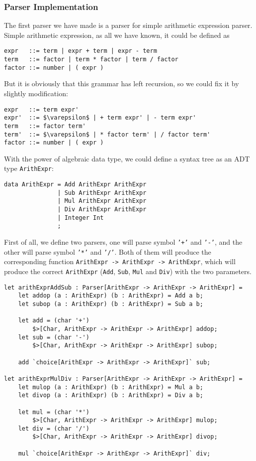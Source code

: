\subsubsection{Parser Implementation}

The first parser we have made is a parser for simple arithmetic expression parser. Simple arithmetic expression, as all we have known, it could be defined as

\begin{lstlisting}[language={}]
expr   ::= term | expr + term | expr - term
term   ::= factor | term * factor | term / factor
factor ::= number | ( expr )
\end{lstlisting}

But it is obviously that this grammar has left recursion, so we could fix it by slightly modification:

\begin{lstlisting}[language={},mathescape]
expr   ::= term expr'
expr'  ::= $\varepsilon$ | + term expr' | - term expr'
term   ::= factor term'
term'  ::= $\varepsilon$ | * factor term' | / factor term'
factor ::= number | ( expr )
\end{lstlisting}

With the power of algebraic data type, we could define a syntax tree as an ADT type \texttt{ArithExpr}:

\begin{lstlisting}
data ArithExpr = Add ArithExpr ArithExpr
               | Sub ArithExpr ArithExpr
               | Mul ArithExpr ArithExpr
               | Div ArithExpr ArithExpr
               | Integer Int
               ;
\end{lstlisting}

First of all, we define two parsers, one will parse symbol \texttt{'+'} and \texttt{'-'}, and the other will parse symbol \texttt{'*'} and \texttt{'/'}. Both of them will produce the corresponding function \texttt{ArithExpr -> ArithExpr -> ArithExpr}, which will produce the correct \texttt{ArithExpr} (\texttt{Add}, \texttt{Sub}, \texttt{Mul} and \texttt{Div}) with the two parameters.

\begin{lstlisting}
let arithExprAddSub : Parser[ArithExpr -> ArithExpr -> ArithExpr] =
    let addop (a : ArithExpr) (b : ArithExpr) = Add a b;
    let subop (a : ArithExpr) (b : ArithExpr) = Sub a b;

    let add = (char '+')
        $>[Char, ArithExpr -> ArithExpr -> ArithExpr] addop;
    let sub = (char '-')
        $>[Char, ArithExpr -> ArithExpr -> ArithExpr] subop;

    add `choice[ArithExpr -> ArithExpr -> ArithExpr]` sub;

let arithExprMulDiv : Parser[ArithExpr -> ArithExpr -> ArithExpr] =
    let mulop (a : ArithExpr) (b : ArithExpr) = Mul a b;
    let divop (a : ArithExpr) (b : ArithExpr) = Div a b;

    let mul = (char '*')
        $>[Char, ArithExpr -> ArithExpr -> ArithExpr] mulop;
    let div = (char '/')
        $>[Char, ArithExpr -> ArithExpr -> ArithExpr] divop;

    mul `choice[ArithExpr -> ArithExpr -> ArithExpr]` div;
\end{lstlisting}


